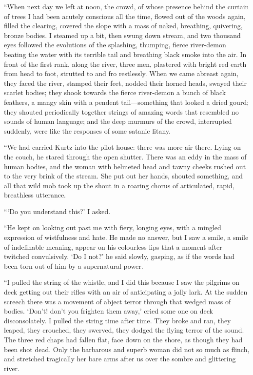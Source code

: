 \documentclass[12pt]{report}
\begin{document}
``When next day we left at noon, the crowd, of whose presence behind the
curtain of trees I had been acutely conscious all the time, flowed out
of the woods again, filled the clearing, covered the slope with a mass
of naked, breathing, quivering, bronze bodies. I steamed up a bit, then
swung down stream, and two thousand eyes followed the evolutions of the
splashing, thumping, fierce river-demon beating the water with its
terrible tail and breathing black smoke into the air. In front of the
first rank, along the river, three men, plastered with bright red earth
from head to foot, strutted to and fro restlessly. When we came abreast
again, they faced the river, stamped their feet, nodded their horned
heads, swayed their scarlet bodies; they shook towards the fierce
river-demon a bunch of black feathers, a mangy skin with a pendent
tail---something that looked a dried gourd; they shouted periodically
together strings of amazing words that resembled no sounds of human
language; and the deep murmurs of the crowd, interrupted suddenly, were
like the responses of some satanic litany.

``We had carried Kurtz into the pilot-house: there was more air there.
Lying on the couch, he stared through the open shutter. There was an
eddy in the mass of human bodies, and the woman with helmeted head and
tawny cheeks rushed out to the very brink of the stream. She put out her
hands, shouted something, and all that wild mob took up the shout in a
roaring chorus of articulated, rapid, breathless utterance.

```Do you understand this?' I asked.

``He kept on looking out past me with fiery, longing eyes, with a
mingled expression of wistfulness and hate. He made no answer, but I saw
a smile, a smile of indefinable meaning, appear on his colourless lips
that a moment after twitched convulsively. `Do I not?' he said slowly,
gasping, as if the words had been torn out of him by a supernatural
power.

``I pulled the string of the whistle, and I did this because I saw the
pilgrims on deck getting out their rifles with an air of anticipating a
jolly lark. At the sudden screech there was a movement of abject terror
through that wedged mass of bodies. `Don't! don't you frighten them
away,' cried some one on deck disconsolately. I pulled the string time
after time. They broke and ran, they leaped, they crouched, they
swerved, they dodged the flying terror of the sound. The three red chaps
had fallen flat, face down on the shore, as though they had been shot
dead. Only the barbarous and superb woman did not so much as flinch, and
stretched tragically her bare arms after us over the sombre and
glittering river.
\end{document}
